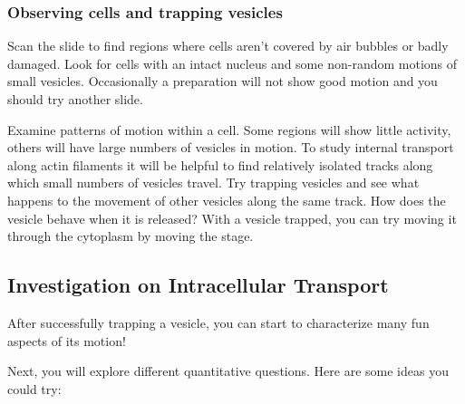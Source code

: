 \documentclass{../lab}
\begin{document}
\subsubsection{Observing cells and trapping vesicles}

Scan the slide to find regions where cells aren't covered by air bubbles or badly damaged. Look for cells with an intact nucleus and some non-random motions of small vesicles. Occasionally a preparation will not show good motion and you should try another slide.

Examine patterns of motion within a cell. Some regions will show little activity, others will have large numbers of vesicles in motion. To study internal transport along actin filaments it will be helpful to find relatively isolated tracks along which small numbers of vesicles travel. Try trapping vesicles and see what happens to the movement of other vesicles along the same track. How does the vesicle behave when it is released? With a vesicle trapped, you can try moving it through the cytoplasm by moving the stage.

\subsection{Investigation on Intracellular Transport}

After successfully trapping a vesicle, you can start to characterize many fun aspects of its motion! 



Next, you will explore different quantitative questions. Here are some ideas you could try:
\end{document}
